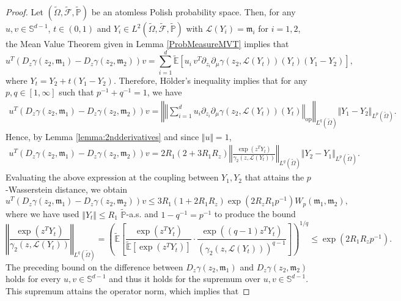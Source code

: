\documentclass[10pt,a4paper]{amsart}
\begin{document}
\begin{proof}
Let $(\widetilde{\Omega},\widetilde{\mathcal F},\widetilde{\mathbb P})$ be an atomless Polish probability space. Then, for any $u,v \in \mathbb S^{d-1}$, $t\in(0,1)$ and $Y_i\in L^2(\widetilde{\Omega},\widetilde{\mathcal F},\widetilde{\mathbb P})$ with $\mathcal L(Y_i)=\mathfrak{m}_i$ for $i=1,2$, the Mean Value Theorem given in Lemma \ref{ProbMeasureMVT} implies that 
\[
u^T\left(D_{z}\gamma(z_2,\mathfrak{m}_1)-D_{z}\gamma(z_2,\mathfrak{m}_2)\right)v = \sum_{i=1}^d\widetilde{\mathbb E} \left[u_i\, v^T\partial_{z_i}\partial_\mu \gamma(z_2,\mathcal L(Y_t))(Y_t)(Y_1-Y_2) \right] ,
\]
where $Y_t=Y_2+t(Y_1-Y_2)$. Therefore, H\"older's inequality implies that for any $p,q\in [1,\infty]$ such that $p^{-1}+q^{-1}=1$, we have 
\begin{align*}
   u^T\left( D_{z}\gamma(z_2,\mathfrak{m}_1)-D_{z}\gamma(z_2,\mathfrak{m}_2)\right)v = \left\Vert \left\Vert \sum_{i=1}^du_i \partial_{z_i}\partial_\mu \gamma(z_2,\mathcal L(Y_t))(Y_t)\right\Vert_\mathrm{op}\right\Vert_{L^q(\widetilde{\Omega})} \Vert Y_1-Y_2\Vert_{L^p(\widetilde{\Omega})}.
\end{align*}
Hence, by Lemma \ref{lemma:2ndderivatives} and since $\Vert u \Vert =1$,
\begin{align*}
    u^T\left( D_{z}\gamma(z_2,\mathfrak{m}_1)-D_{z}\gamma(z_2,\mathfrak{m}_2)\right)v = 2R_1(2+3R_1R_z)\left\Vert \frac{\exp(z^TY_t)}{\gamma_2\left(z,\mathcal L(Y_t)\right)}\right\Vert_{L^q(\widetilde{\Omega})} \Vert  Y_2-Y_1\Vert_{L^p(\widetilde{\Omega})}.
\end{align*}
Evaluating the above expression at the coupling between $Y_1,Y_2$ that attains the $p$-Wasserstein distance,  we obtain
\begin{equation*}
    u^T\left(D_z\gamma(z_2,\mathfrak{m}_1)-D_{z}\gamma(z_2,\mathfrak{m}_2)\right)v\le 3R_1(1+2R_1R_z) \exp(2R_zR_1p^{-1}) W_p(\mathfrak{m}_1,\mathfrak{m}_2),
\end{equation*}
 where we have used $\Vert Y_t\Vert \le R_1 $ $\widetilde{\mathbb P}$-a.s. and  $1-q^{-1}=p^{-1}$ to produce the bound $$\left\Vert \frac{\exp(z^TY_t)}{\gamma_2(z,\mathcal L(Y_t))}\right\Vert_{L^q(\widetilde{\Omega})}=\left(\widetilde{\mathbb E}\left[\frac{\exp(z^TY_t)}{\widetilde{\mathbb E}\left[\exp(z^TY_t)\right]}\cdot \frac{\exp((q-1)z^TY_t)}{(\gamma_2(z,\mathcal L(Y_t)))^{q-1}}\right]\right)^{1/q}\le \exp\left(2R_1R_zp^{-1}\right).$$ 
 The preceding bound on the difference between $D_z\gamma(z_2,\mathfrak{m}_1)$ and $D_z\gamma(z_2,\mathfrak{m}_2)$ holds for every $u,v\in\mathbb S^{d-1}$ and thus it holds for the supremum over $u,v\in\mathbb S^{d-1}$. This supremum attains the operator norm, which implies that

\end{proof}
\end{document}
